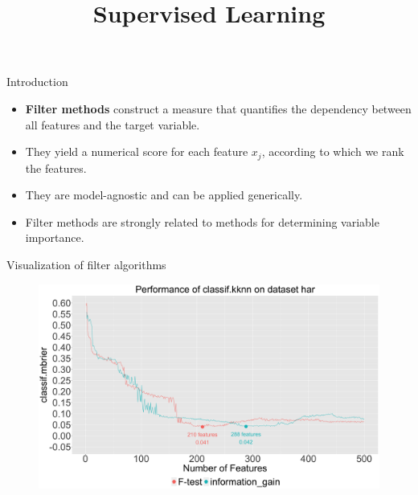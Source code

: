 \documentclass[11pt,compress,t,notes=noshow, xcolor=table]{beamer}
\title{Supervised Learning}
\date{}
\begin{document}

  \begin{vbframe}{Introduction}
  \vspace{0.4cm}
  \begin{itemize}
  \setlength{\itemsep}{1.5em}
    \item \textbf{Filter methods} construct a measure that quantifies the dependency between all features and the target variable.
    \item They yield a numerical score for each feature $x_j$, according to which we rank the features.
    \item They are model-agnostic and can be applied generically.
    \item Filter methods are strongly related to methods for determining variable importance.
  \end{itemize}
  \end{vbframe}

\begin{vbframe}{Visualization of filter algorithms}
  \begin{center}
  \begin{figure}
    \includegraphics[width=1\textwidth]{figure/filter_comparison_har_classif.kknn.png}
  \end{figure}
  \end{center}

\end{vbframe}
\end{document}
